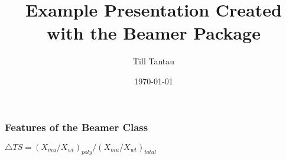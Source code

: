 \documentclass{beamer}
\title{Example Presentation Created with the Beamer Package}
\author{Till Tantau}
\date{\today}
\begin{document}
\frame
{
  \frametitle{Features of the Beamer Class}


  $\triangle TS = (X_{mu}/X_{wt})_{poly}/(X_{mu}/X_{wt})_{total}$
  

 }
\end{document}
